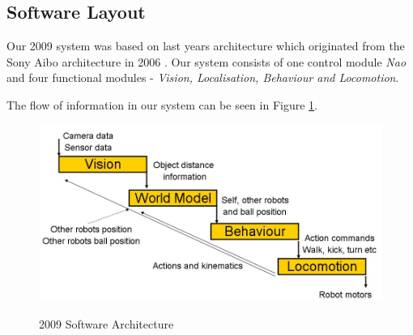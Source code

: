 \subsection{Software Layout}

Our 2009 system was based on last years architecture \cite{NUManoids2008}which originated from the Sony Aibo architecture in 2006 \cite{NUBOT2006}. Our system consists of one control module \emph{Nao} and four functional modules -
\emph{Vision, Localisation, Behaviour and Locomotion}. 

The flow of information in our system can be seen in Figure
\ref{fig:software}. 

\begin{figure}[!h]
\begin{center}
    \scalebox{0.5} {\includegraphics{figs/software.jpg} }
    \caption{2009 Software Architecture}
    \label{fig:software}
\end{center}
\end{figure}

